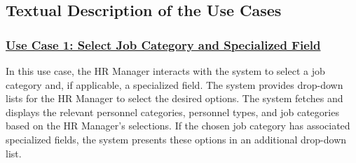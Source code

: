 \subsection{Textual Description of the Use Cases}
\subsubsection{\underline{Use Case 1: Select Job Category and Specialized Field}}
In this use case, the HR Manager interacts with the system to select a job category and, if applicable, a specialized field. The system provides drop-down lists for the HR Manager to select the desired options. The system fetches and displays the relevant personnel categories, personnel types, and job categories based on the HR Manager's selections. If the chosen job category has associated specialized fields, the system presents these options in an additional drop-down list.


